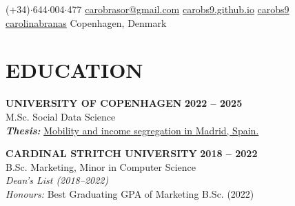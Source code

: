 \documentclass{resume}
\begin{document}
\begin{center}
    \contact
        {(+34)$\cdot$644$\cdot$004$\cdot$477}
        {\href{mailto://carobrasor@gmail.com}{carobrasor@gmail.com}}
        {\href{https://carobs9.github.io/}{carobs9.github.io}}
        {\href{https://github.com/carobs9}{carobs9}}
        {\href{https://www.linkedin.com/in/carolinabranas/}{carolinabranas}}
        {Copenhagen, Denmark}
\end{center}

\section{EDUCATION} 
\begin{content}
    {\bf UNIVERSITY OF COPENHAGEN} \hfill {\bf 2022 -- 2025} \\
    {M.Sc. Social Data Science} \\
    {\bf \em Thesis:} {\href{https://carobs9.github.io/segregation-mobility/}{Mobility and income segregation in Madrid, Spain.}}

    \medskip

    {\bf CARDINAL STRITCH UNIVERSITY} \hfill {\bf 2018 -- 2022} \\
    {B.Sc. Marketing, Minor in Computer Science} \\
    {\em Dean's List (2018--2022)} \\
    {\em Honours:} Best Graduating GPA of Marketing B.Sc. (2022)
\end{content}

\end{document}
